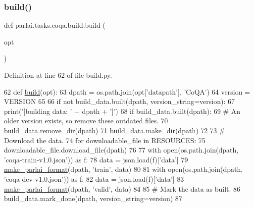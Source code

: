 \subsubsection{\texorpdfstring{build()}{build()}}
{\footnotesize\ttfamily def parlai.\+tasks.\+coqa.\+build.\+build (\begin{DoxyParamCaption}\item[{}]{opt }\end{DoxyParamCaption})}



Definition at line 62 of file build.\+py.


\begin{DoxyCode}
62 \textcolor{keyword}{def }\hyperlink{namespacedialog__babi__feedback_1_1build_a7a9d289f7493a5ded13c4b7f071b6184}{build}(opt):
63     dpath = os.path.join(opt[\textcolor{stringliteral}{'datapath'}], \textcolor{stringliteral}{'CoQA'})
64     version = VERSION
65 
66     \textcolor{keywordflow}{if} \textcolor{keywordflow}{not} build\_data.built(dpath, version\_string=version):
67         print(\textcolor{stringliteral}{'[building data: '} + dpath + \textcolor{stringliteral}{']'})
68         \textcolor{keywordflow}{if} build\_data.built(dpath):
69             \textcolor{comment}{# An older version exists, so remove these outdated files.}
70             build\_data.remove\_dir(dpath)
71         build\_data.make\_dir(dpath)
72 
73         \textcolor{comment}{# Download the data.}
74         \textcolor{keywordflow}{for} downloadable\_file \textcolor{keywordflow}{in} RESOURCES:
75             downloadable\_file.download\_file(dpath)
76 
77         with open(os.path.join(dpath, \textcolor{stringliteral}{'coqa-train-v1.0.json'})) \textcolor{keyword}{as} f:
78             data = json.load(f)[\textcolor{stringliteral}{'data'}]
79             \hyperlink{namespaceparlai_1_1tasks_1_1quac_1_1build_a08c212462b5c58cde91192d35f24f0cc}{make\_parlai\_format}(dpath, \textcolor{stringliteral}{'train'}, data)
80 
81         with open(os.path.join(dpath, \textcolor{stringliteral}{'coqa-dev-v1.0.json'})) \textcolor{keyword}{as} f:
82             data = json.load(f)[\textcolor{stringliteral}{'data'}]
83             \hyperlink{namespaceparlai_1_1tasks_1_1quac_1_1build_a08c212462b5c58cde91192d35f24f0cc}{make\_parlai\_format}(dpath, \textcolor{stringliteral}{'valid'}, data)
84 
85         \textcolor{comment}{# Mark the data as built.}
86         build\_data.mark\_done(dpath, version\_string=version)
87 \end{DoxyCode}
\mbox{\label{namespaceparlai_1_1tasks_1_1coqa_1_1build_ae2bc52f1ecab4681f1c2ebf013629aec}} 
